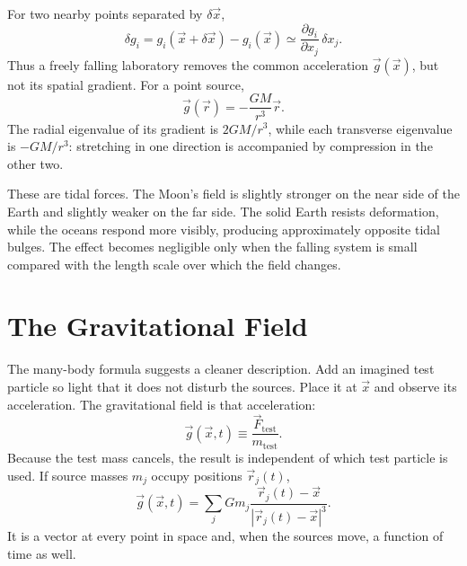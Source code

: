 For two nearby points separated by \(\delta\vec x\),
\begin{equation}
  \delta g_i
  =
  g_i(\vec x+\delta\vec x)-g_i(\vec x)
  \simeq
  \frac{\partial g_i}{\partial x_j}\,\delta x_j.
  \label{eq:l01-tidal-gradient}
\end{equation}
Thus a freely falling laboratory removes the common acceleration
\(\vec g(\vec x)\), but not its spatial gradient. For a point source,
\begin{equation}
  \vec g(\vec r)=-\frac{GM}{r^3}\vec r.
\end{equation}
The radial eigenvalue of its gradient is \(2GM/r^3\), while each transverse
eigenvalue is \(-GM/r^3\): stretching in one direction is accompanied by
compression in the other two.

These are tidal forces. The Moon's field is slightly stronger on the near
side of the Earth and slightly weaker on the far side. The solid Earth
resists deformation, while the oceans respond more visibly, producing
approximately opposite tidal bulges. The effect becomes negligible only
when the falling system is small compared with the length scale over which
the field changes.

\begin{classroomqa}
\end{classroomqa}

\section{The Gravitational Field}

The many-body formula suggests a cleaner description. Add an imagined test
particle so light that it does not disturb the sources. Place it at
\(\vec x\) and observe its acceleration. The gravitational field is that
acceleration:
\begin{equation}
  \vec g(\vec x,t)
  \equiv
  \frac{\vec F_{\mathrm{test}}}{m_{\mathrm{test}}}.
  \label{eq:l01-field-definition}
\end{equation}
Because the test mass cancels, the result is independent of which test
particle is used. If source masses \(m_j\) occupy positions \(\vec r_j(t)\),
\begin{equation}
  \boxed{
  \vec g(\vec x,t)
  =
  \sum_j Gm_j
  \frac{\vec r_j(t)-\vec x}
       {|\vec r_j(t)-\vec x|^3}.}
  \label{eq:l01-field-sum}
\end{equation}
It is a vector at every point in space and, when the sources move, a function
of time as well.

